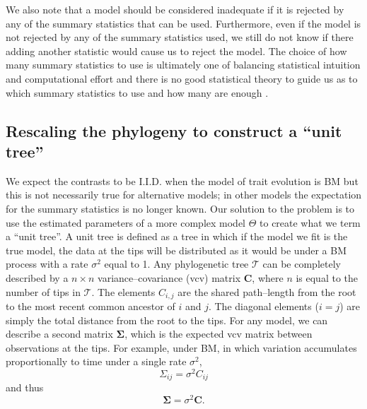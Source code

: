 \documentclass[a4paper,12pt]{article}
\begin{document}
We also note that a model should be considered inadequate if it is rejected by any of the summary statistics that can be used. Furthermore, even if the model is not rejected by any of the summary statistics used, we still do not know if there adding another statistic would cause us to reject the model. The choice of how many summary statistics to use is ultimately one of balancing statistical intuition and computational effort and there is no good statistical theory to guide us as to which summary statistics to use and how many are enough \citep{Gelmanbook}.

\subsection*{Rescaling the phylogeny to construct a ``unit tree''}

We expect the contrasts to be I.I.D. when the model of trait evolution is BM but this is not necessarily true for alternative models; in other models the expectation for the summary statistics is no longer known. Our solution to the problem is to use the estimated parameters of a more complex model $\Theta$ to create what we term a ``unit tree''. A unit tree is defined as a tree in which if the model we fit is the true model, the data at the tips will be distributed as it would be under a BM process with a rate $\sigma^2$ equal to 1. Any phylogenetic tree $\mathcal{T}$ can be completely described by a $n \times n$ variance--covariance (vcv) matrix $\mathbf{C}$, where $n$ is equal to the number of tips in $\mathcal{T}$. The elements $C_{i,j}$ are the shared path--length from the root to the most recent common ancestor of $i$ and $j$. The diagonal elements ($i = j$) are simply the total distance from the root to the tips. For any model, we can describe a second matrix $\mathbf{\Sigma}$, which is the expected vcv matrix between observations at the tips. For example, under BM, in which variation accumulates proportionally to time under a single rate $\sigma^2$,
\begin{equation}
\Sigma_{ij} = \sigma^2 C_{ij}
\end{equation}
and thus
\begin{equation}
\mathbf{\Sigma} = \sigma^2 \mathbf{C}.
\end{equation}
\end{document}
